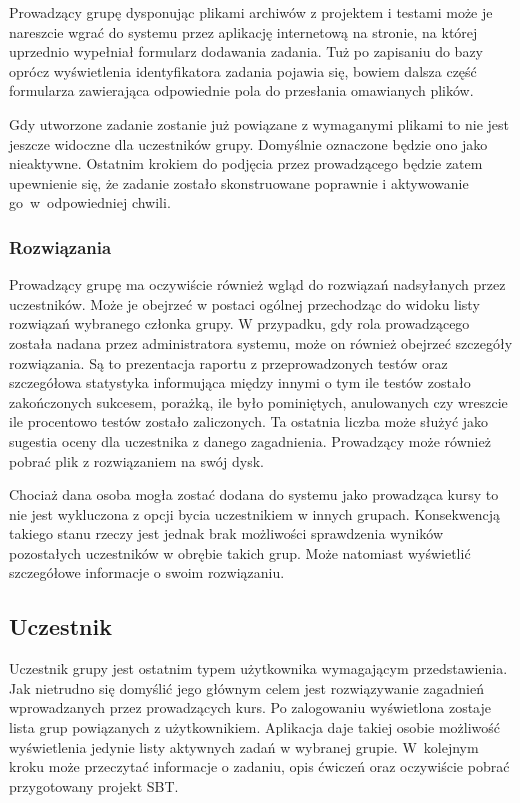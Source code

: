\documentclass[wimgr]{xmgr}
\begin{document}
Prowadzący grupę dysponując plikami archiwów z projektem i testami może je nareszcie wgrać do systemu przez aplikację internetową na stronie, na której uprzednio wypełniał formularz dodawania zadania. Tuż po zapisaniu do bazy oprócz wyświetlenia identyfikatora zadania pojawia się, bowiem dalsza część formularza zawierająca odpowiednie pola do przesłania omawianych plików.

Gdy utworzone zadanie zostanie już powiązane z wymaganymi plikami to nie jest jeszcze widoczne dla uczestników grupy. Domyślnie oznaczone będzie ono jako nieaktywne. Ostatnim krokiem do podjęcia przez prowadzącego będzie zatem upewnienie się, że zadanie zostało skonstruowane poprawnie i aktywowanie go~w~odpowiedniej chwili.

\subsubsection{Rozwiązania}

Prowadzący grupę ma oczywiście również wgląd do rozwiązań nadsyłanych przez uczestników. Może je obejrzeć w postaci ogólnej przechodząc do widoku listy rozwiązań wybranego członka grupy. W przypadku, gdy rola prowadzącego została nadana przez administratora systemu, może on również obejrzeć szczegóły rozwiązania. Są to prezentacja raportu z przeprowadzonych testów oraz szczegółowa statystyka informująca między innymi o tym ile testów zostało zakończonych sukcesem, porażką, ile było pominiętych, anulowanych czy wreszcie ile procentowo testów zostało zaliczonych. Ta ostatnia liczba może służyć jako sugestia oceny dla uczestnika z danego zagadnienia. Prowadzący może również pobrać plik z rozwiązaniem na swój dysk.

Chociaż dana osoba mogła zostać dodana do systemu jako prowadząca kursy to nie jest wykluczona z opcji bycia uczestnikiem w innych grupach. Konsekwencją takiego stanu rzeczy jest jednak brak możliwości sprawdzenia wyników pozostałych uczestników w obrębie takich grup. Może natomiast wyświetlić szczegółowe informacje o swoim rozwiązaniu.

\subsection{Uczestnik}

Uczestnik grupy jest ostatnim typem użytkownika wymagającym przedstawienia. Jak nietrudno się domyślić jego głównym celem jest rozwiązywanie zagadnień wprowadzanych przez prowadzących kurs. Po zalogowaniu wyświetlona zostaje lista grup powiązanych z użytkownikiem. Aplikacja daje takiej osobie możliwość wyświetlenia jedynie listy aktywnych zadań w wybranej grupie. W~kolejnym kroku może przeczytać informacje o zadaniu, opis ćwiczeń oraz oczywiście pobrać przygotowany projekt SBT.   
\end{document}
